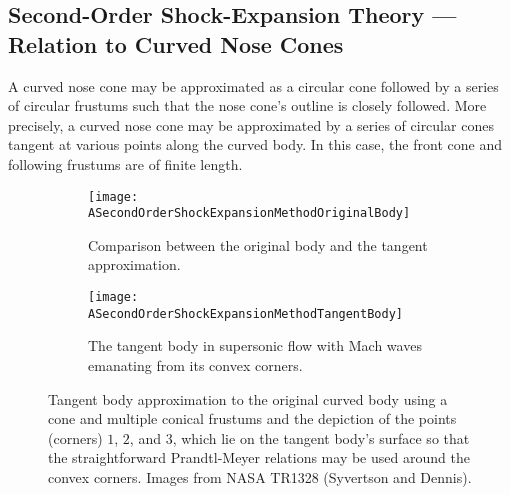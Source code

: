 \documentclass[11pt,dvipsnames]{thesis}
\begin{document}



\subsection{Second-Order Shock-Expansion Theory --- Relation to Curved Nose Cones}
A curved nose cone may be approximated as a circular cone followed by a series of circular frustums such that the nose cone's outline is closely followed. More precisely, a curved nose cone may be approximated by a series of circular cones tangent at various points along the curved body. In this case, the front cone and following frustums are of finite length. 
\begin{figure}[H]
  \centering
  \begin{subfigure}[b]{0.49\linewidth}
    \texttt{[image: ASecondOrderShockExpansionMethodOriginalBody]}
    \caption{Comparison between the original body and the tangent approximation.}
    \label{fig:AerodynamicsSecondOrderOriginalBody}
  \end{subfigure}
  \begin{subfigure}[b]{0.49\linewidth}
    \texttt{[image: ASecondOrderShockExpansionMethodTangentBody]}
    \caption{The tangent body in supersonic flow with Mach waves emanating from its convex corners.}
    \label{fig:AerodynamicsSecondOrderTangentBody}
  \end{subfigure}
  \caption{Tangent body approximation to the original curved body using a cone and multiple conical frustums and the depiction of the points (corners) $1$, $2$, and $3$, which lie on the tangent body's surface so that the straightforward Prandtl-Meyer relations may be used around the convex corners. Images from NASA TR1328 (Syvertson and Dennis).}
  \label{fig:AerodynamicsSecondOrderBodies}
\end{figure}
\end{document}
